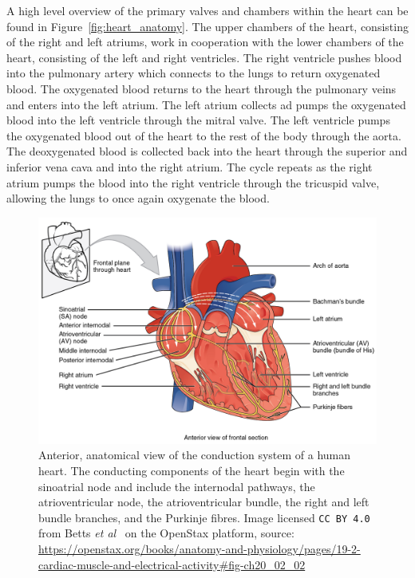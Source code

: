 \documentclass[\main/thesis.tex]{subfiles}
\begin{document}
A high level overview of the primary valves and chambers within the heart can be found in Figure~\ref{fig:heart_anatomy}.
The upper chambers of the heart, consisting of the right and left atriums, work in cooperation with the lower chambers of the heart, consisting of the left and right ventricles.
The right ventricle pushes blood into the pulmonary artery which connects to the lungs to return oxygenated blood.
The oxygenated blood returns to the heart through the pulmonary veins and enters into the left atrium.
The left atrium collects ad pumps the oxygenated blood into the left ventricle through the mitral valve.
The left ventricle pumps the oxygenated blood out of the heart to the rest of the body through the aorta.
The deoxygenated blood is collected back into the heart through the superior and inferior vena cava and into the right atrium.
The cycle repeats as the right atrium pumps the blood into the right ventricle through the tricuspid valve, allowing the lungs to once again oxygenate the blood.

\begin{figure}[ht]
    \centering
    \includegraphics[width=14cm]{figure/conduction-system-of-the-heart.jpeg}
    \caption[Anterior, anatomical view of the conduction system of a human heart.]{Anterior, anatomical view of the conduction system of a human heart. The conducting components of the heart begin with the sinoatrial node and include the internodal pathways, the atrioventricular node, the atrioventricular bundle, the right and left bundle branches, and the Purkinje fibres.
    Image licensed \texttt{CC BY 4.0} from Betts \emph{et al}~\cite{betts-anatomy-and-physiology} on the OpenStax platform, source: \url{https://openstax.org/books/anatomy-and-physiology/pages/19-2-cardiac-muscle-and-electrical-activity\#fig-ch20_02_02}}
    \label{fig:heart_conduction_system}
\end{figure}
\end{document}
